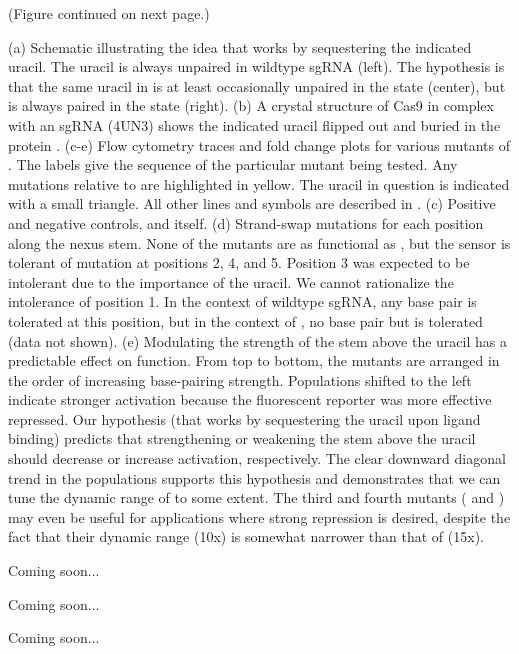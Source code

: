 \documentclass[10pt,oneside]{article}
\begin{document}


    (Figure continued on next page.)



    (a) Schematic illustrating the idea that \ligrnaB{} works by sequestering the indicated uracil.  The uracil is always unpaired in wildtype sgRNA (left).  The hypothesis is that the same uracil in \ligrnaB{} is at least occasionally unpaired in the \apo{} state (center), but is always paired in the \holo{} state (right).
    (b) A crystal structure of Cas9 in complex with an sgRNA (4UN3) shows the indicated uracil flipped out and buried in the protein \autocite{nishimasu2014}.
    (c-e) Flow cytometry traces and fold change plots for various mutants of \ligrnaB{}.  The labels give the sequence of the particular mutant being tested.  Any mutations relative to \ligrnaB{} are highlighted in yellow.  The uracil in question is indicated with a small triangle.  All other lines and symbols are described in .
    (c) Positive and negative controls, and \ligrnaB{} itself.
    (d) Strand-swap mutations for each position along the nexus stem.  None of the mutants are as functional as \ligrnaB{}, but the sensor is tolerant of mutation at positions 2, 4, and 5.  Position 3 was expected to be intolerant due to the importance of the uracil.  We cannot rationalize the intolerance of position 1.  In the context of wildtype sgRNA, any base pair is tolerated at this position, but in the context of \ligrnaB{}, no base pair but  is tolerated (data not shown).
    (e) Modulating the strength of the stem above the uracil has a predictable effect on function.  From top to bottom, the mutants are arranged in the order of increasing base-pairing strength.  Populations shifted to the left indicate stronger activation because the fluorescent reporter was more effective repressed.  Our hypothesis (that \ligrnaB{} works by sequestering the uracil upon ligand binding) predicts that strengthening or weakening the stem above the uracil should decrease or increase activation, respectively.  The clear downward diagonal trend in the populations supports this hypothesis and demonstrates that we can tune the dynamic range of \ligrnaB{} to some extent.  The third and fourth mutants ( and ) may even be useful for applications where strong repression is desired, despite the fact that their dynamic range (10x) is somewhat narrower than that of \ligrnaB{} (15x).


    Coming soon...


    Coming soon...


    Coming soon...

\printbibliography[title=References]
\end{document}
